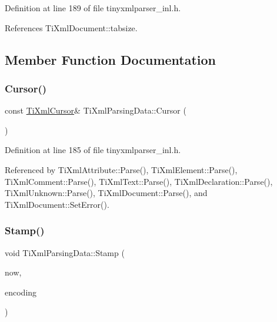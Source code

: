 Definition at line 189 of file tinyxmlparser\+\_\+inl.\+h.



References Ti\+Xml\+Document\+::tabsize.



\subsection{Member Function Documentation}
\hypertarget{class_ti_xml_parsing_data_a56908a17d7d7a6b2e511e62cf1d40d05}{}\label{class_ti_xml_parsing_data_a56908a17d7d7a6b2e511e62cf1d40d05} 
\subsubsection{\texorpdfstring{Cursor()}{Cursor()}}
{\footnotesize\ttfamily const \hyperlink{struct_ti_xml_cursor}{Ti\+Xml\+Cursor}\& Ti\+Xml\+Parsing\+Data\+::\+Cursor (\begin{DoxyParamCaption}{ }\end{DoxyParamCaption})\hspace{0.3cm}{\ttfamily [inline]}}



Definition at line 185 of file tinyxmlparser\+\_\+inl.\+h.



Referenced by Ti\+Xml\+Attribute\+::\+Parse(), Ti\+Xml\+Element\+::\+Parse(), Ti\+Xml\+Comment\+::\+Parse(), Ti\+Xml\+Text\+::\+Parse(), Ti\+Xml\+Declaration\+::\+Parse(), Ti\+Xml\+Unknown\+::\+Parse(), Ti\+Xml\+Document\+::\+Parse(), and Ti\+Xml\+Document\+::\+Set\+Error().

\hypertarget{class_ti_xml_parsing_data_a65cee8ab77a36c605db08c84b4c30a7d}{}\label{class_ti_xml_parsing_data_a65cee8ab77a36c605db08c84b4c30a7d} 
\subsubsection{\texorpdfstring{Stamp()}{Stamp()}}
{\footnotesize\ttfamily void Ti\+Xml\+Parsing\+Data\+::\+Stamp (\begin{DoxyParamCaption}\item[{const char $\ast$}]{now,  }\item[{\hyperlink{tinyxml_8h_a88d51847a13ee0f4b4d320d03d2c4d96}{Ti\+Xml\+Encoding}}]{encoding }\end{DoxyParamCaption})}



